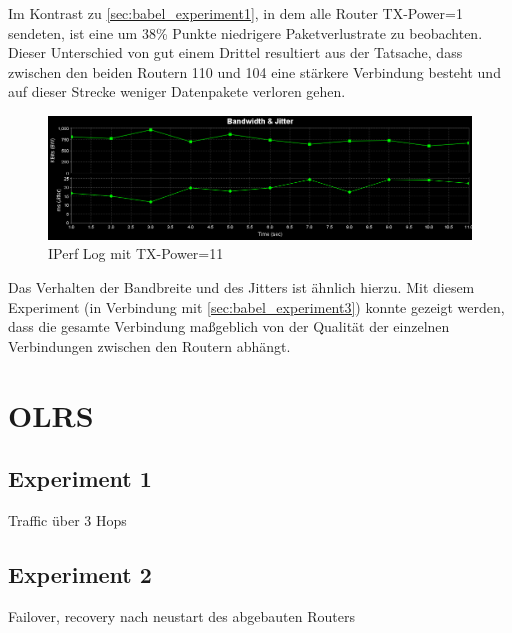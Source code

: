 \documentclass[10pt]{scrartcl}
\begin{document}
Im Kontrast zu \ref{sec:babel_experiment1}, in dem alle Router TX-Power=1 sendeten, ist eine um 38\% Punkte niedrigere Paketverlustrate zu beobachten. Dieser Unterschied von gut einem Drittel resultiert aus der Tatsache, dass zwischen den beiden Routern 110 und 104 eine stärkere Verbindung besteht und auf dieser Strecke weniger Datenpakete verloren gehen.

	\begin{figure}
        \centering
                \includegraphics[width=\textwidth]{img/4_UDP_Babel_TX1_10MB}
        \caption{IPerf Log mit TX-Power=11}
        \label{img:babel_iperf_graph_tx11}
	\end{figure}
	
Das Verhalten der Bandbreite und des Jitters ist ähnlich hierzu.
Mit diesem Experiment (in Verbindung mit \ref{sec:babel_experiment3}) konnte gezeigt werden, dass die gesamte Verbindung maßgeblich von der Qualität der einzelnen Verbindungen zwischen den Routern abhängt.

\section{OLRS}
	\subsection{Experiment 1}
	Traffic über 3 Hops	
	
	\subsection{Experiment 2}
	Failover, recovery nach neustart des abgebauten Routers
\end{document}
